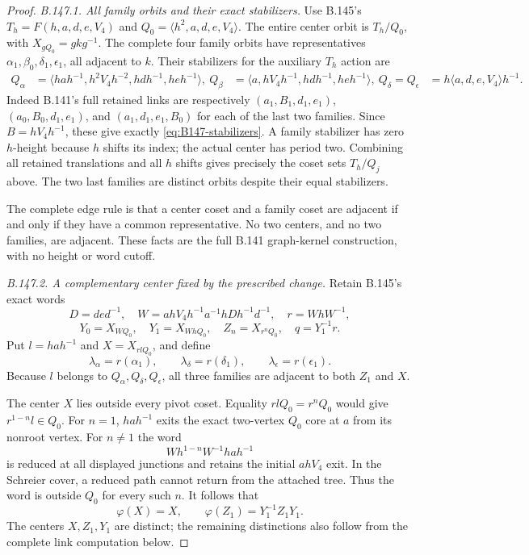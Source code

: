 \begin{proof}
\emph{B.147.1. All family orbits and their exact stabilizers.}
Use B.145's $T_h=F(h,a,d,e,V_4)$ and
$Q_0=\langle h^2,a,d,e,V_4\rangle$. The entire center orbit is
$T_h/Q_0$, with $X_{gQ_0}=gkg^{-1}$. The complete four family
orbits have representatives
$\alpha_1,\beta_0,\delta_1,\epsilon_1$, all adjacent to $k$.
Their stabilizers for the auxiliary $T_h$ action are
\begin{equation}\label{eq:B147-stabilizers}
\begin{aligned}
 Q_\alpha&=\langle hah^{-1},h^2V_4h^{-2},hdh^{-1},heh^{-1}\rangle,\
 Q_\beta&=\langle a,hV_4h^{-1},hdh^{-1},heh^{-1}\rangle,\
 Q_\delta=Q_\epsilon&=h\langle a,d,e,V_4\rangle h^{-1}.
\end{aligned}
\end{equation}
Indeed B.141's full retained links are respectively
$(a_1,B_1,d_1,e_1)$, $(a_0,B_0,d_1,e_1)$, and
$(a_1,d_1,e_1,B_0)$ for each of the last two families.
Since $B=hV_4h^{-1}$, these give exactly
\eqref{eq:B147-stabilizers}. A family stabilizer has zero
$h$-height because $h$ shifts its index; the actual center has
period two. Combining all retained translations and all $h$
shifts gives precisely the coset sets $T_h/Q_j$ above. The two
last families are distinct orbits despite their equal stabilizers.

The complete edge rule is that a center coset and a family coset
are adjacent if and only if they have a common representative.
No two centers, and no two families, are adjacent. These facts
are the full B.141 graph-kernel construction, with no height or
word cutoff.

\emph{B.147.2. A complementary center fixed by the prescribed change.}
Retain B.145's exact words
\[
 D=ded^{-1},\quad
 W=ahV_4h^{-1}a^{-1}hDh^{-1}d^{-1},\quad r=WhW^{-1},
\]
\[
 Y_0=X_{WQ_0},\quad Y_1=X_{WhQ_0},\quad
 Z_n=X_{r^nQ_0},\quad q=Y_1^{-1}r.
\]
Put $l=hah^{-1}$ and $X=X_{rlQ_0}$, and define
\[
 \lambda_\alpha=r(\alpha_1),\qquad
 \lambda_\delta=r(\delta_1),\qquad
 \lambda_\epsilon=r(\epsilon_1).
\]
Because $l$ belongs to $Q_\alpha,Q_\delta,Q_\epsilon$, all
three families are adjacent to both $Z_1$ and $X$.

The center $X$ lies outside every pivot coset. Equality
$rlQ_0=r^nQ_0$ would give $r^{1-n}l\in Q_0$. For $n=1$,
$hah^{-1}$ exits the exact two-vertex $Q_0$ core at $a$ from
its nonroot vertex. For $n\ne1$ the word
\[
 Wh^{1-n}W^{-1}hah^{-1}
\]
is reduced at all displayed junctions and retains the initial
$ahV_4$ exit. In the Schreier cover, a reduced path cannot return
from the attached tree. Thus the word is outside $Q_0$ for every
such $n$. It follows that
\begin{equation}\label{eq:B147-center-values}
 \varphi(X)=X,\qquad
 \varphi(Z_1)=Y_1^{-1}Z_1Y_1.
\end{equation}
The centers $X,Z_1,Y_1$ are distinct; the remaining distinctions
also follow from the complete link computation below.


\end{proof}
